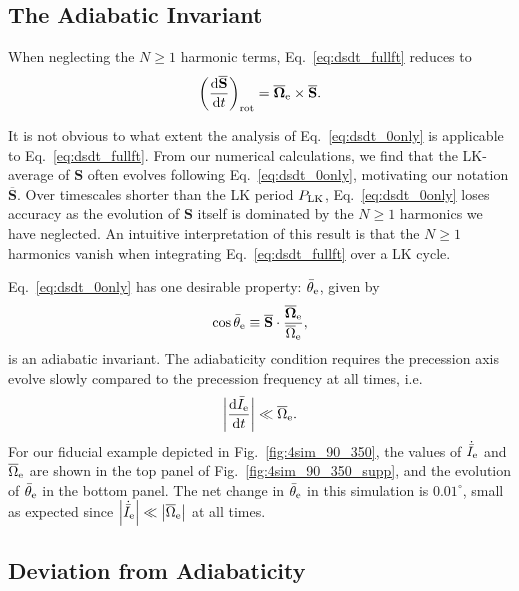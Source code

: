 \documentclass[
        twocolumn,
        twocolappendix
    ]{aastex63}
\newcommand*{\rd}[2]{\frac{\mathrm{d}#1}{\mathrm{d}#2}}
\newcommand*{\abs}[1]{\left|#1\right|}
\renewcommand*{\bm}[1]{\boldsymbol{\mathbf{#1}}}
\newcommand*{\p}[1]{\left(#1\right)}
\begin{document}
\subsection{The Adiabatic Invariant}

When neglecting the $N \geq 1$ harmonic terms, Eq.~\eqref{eq:dsdt_fullft}
reduces to
\begin{equation}
    \p{\rd{\bm{\overline{S}}}{t}}_{\rm rot}
        = \bm{\overline{\Omega}}_{\rm e}
            \times \bm{\overline{S}}.\label{eq:dsdt_0only}
\end{equation}

It is not obvious to what extent the analysis of Eq.~\eqref{eq:dsdt_0only} is
applicable to Eq.~\eqref{eq:dsdt_fullft}. From our numerical calculations, we
find that the LK-average of $\bm{S}$ often evolves following
Eq.~\eqref{eq:dsdt_0only}, motivating our notation $\bm{\overline{S}}$. Over
timescales shorter than the LK period $P_{\rm LK}$, Eq.~\eqref{eq:dsdt_0only}
loses accuracy as the evolution of $\bm{S}$ itself is dominated by the $N \geq
1$ harmonics we have neglected. An intuitive interpretation of this result is
that the $N \geq 1$ harmonics vanish when integrating Eq.~\eqref{eq:dsdt_fullft}
over a LK cycle.

Eq.~\eqref{eq:dsdt_0only} has one desirable property: $\bar{\theta}_{\rm e}$,
given by
\begin{equation}
    \cos \bar{\theta}_{\rm e} \equiv
        \bm{\overline{S}} \cdot \frac{\bm{\overline{\Omega}}_{\rm
            e}}{\overline{\Omega}_{\rm e}},
        \label{eq:q_eff}
\end{equation}
is an adiabatic invariant. The adiabaticity condition requires the precession
axis evolve slowly compared to the precession frequency at all times, i.e.
\begin{equation}
    \abs{\rd{\bar{I}_{\rm e}}{t}} \ll \overline{\Omega}_{\rm e}.\label{eq:ad_constr}
\end{equation}
For our fiducial example depicted in Fig.~\ref{fig:4sim_90_350}, the values of
$\dot{\bar{I}}_{\rm e}$ and $\overline{\Omega}_{\rm e}$ are shown in the top
panel of Fig.~\ref{fig:4sim_90_350_supp}, and the evolution of
$\bar{\theta}_{\rm e}$ in the bottom panel. The net change in $\bar{\theta}_{\rm
e}$ in this simulation is $0.01^\circ$, small as expected since
$\abs{\dot{\bar{I}}_{\rm e}} \ll \abs{\overline{\Omega}_{\rm e}}$ at all times.

\subsection{Deviation from Adiabaticity}\label{ss:eom_0}
\end{document}
